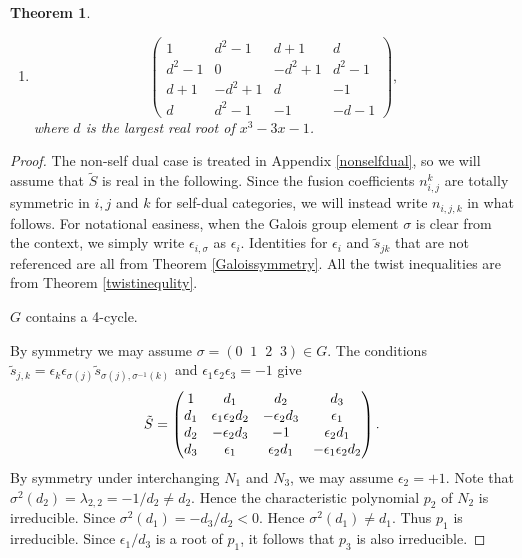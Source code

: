 \documentclass[12pt,psamsfonts]{amsart}
\newcommand{\e}{{\epsilon}}
\newcommand{\tS}{\tilde{S}}
\numberwithin{equation}{section}
\newtheorem{theorem}{Theorem}[section]
\theoremstyle{definition}
\begin{document}
\begin{theorem}
\begin{enumerate}
 \item

  \[
 \begin{pmatrix}
   1& d^2-1& d+1 &d \\
   d^2-1 & 0& -d^2+1 & d^2-1  \\
   d+1& -d^2+1 & d &-1 \\
   d &d^2-1 &-1 & -d-1
 \end{pmatrix},
 \] where $d$ is the largest real root of $x^3-3x-1$.

\end{enumerate}

\end{theorem}



\begin{proof}

The non-self dual case is treated in Appendix \ref{nonselfdual},
so we will assume that $\tS$ is real in the following.  Since the
fusion coefficients $n_{i,j}^k$ are totally symmetric in $i,j$ and
$k$ for self-dual categories, we will instead write $n_{i,j,k}$ in
what follows.  For notational easiness, when the Galois group element $\sigma$ is clear from
the context, we simply write $\epsilon_{i,\sigma}$ as $\epsilon_i$.  Identities for $\epsilon_i$ and
$\tilde{s}_{jk}$ that are not referenced are all from Theorem \ref{Galoissymmetry}.  All the
twist inequalities are from Theorem \ref{twistinequlity}.

\vspace{.5cm}

  $G$ contains a 4-cycle.

\vspace{.5cm}

By symmetry we may assume $\sigma=(0\;\;1\;\;2\;\; 3)\in G$. The
conditions $\tilde s_{j,k}=\e_k \e_{\sigma(j)} \tilde
s_{\sigma(j),\sigma^{-1}(k)}$ and $\e_1 \e_2 \e_3=-1$ give
$$\tilde S=\left(\begin{matrix} 1 & d_1 & d_2 & d_3\cr d_1 & \e_1\e_2 d_2 &
-\e_2 d_3 & \e_1\cr d_2 & -\e_2 d_3 & -1 & \e_2 d_1\cr d_3 & \e_1
& \e_2 d_1 & -\e_1\e_2 d_2\end{matrix}\right).$$ By symmetry under
interchanging $N_1$ and $N_3$, we may assume $\e_2=+1$. Note that
$\sigma^2(d_2)=\lambda_{2,2}=-1/d_2\ne d_2$. Hence the
characteristic polynomial $p_2$ of $N_2$ is irreducible. Since
$\sigma^2(d_1)=-d_3/d_2<0$. Hence $\sigma^2(d_1)\ne d_1$. Thus
$p_1$ is irreducible. Since $\e_1/d_3$ is a root of $p_1$, it
follows that $p_3$ is also irreducible.


\end{proof}
\end{document}
